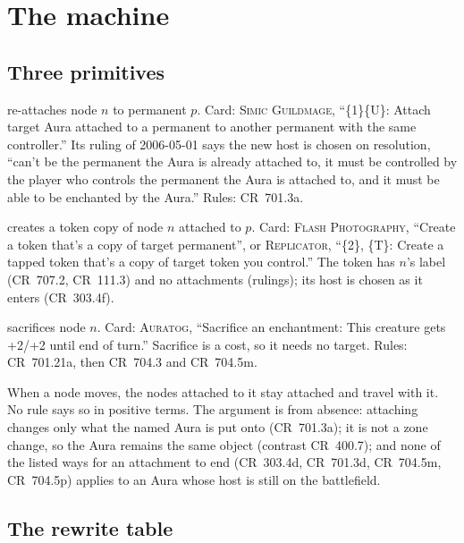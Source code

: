 \documentclass[11pt]{article}
\theoremstyle{definition}
\newcommand{\ms}[1]{\{#1\}}
\newcommand{\card}[1]{{\mdseries\scshape #1}}
\newcommand{\CR}[1]{CR~#1}
\newcommand{\mv}{\to}
\begin{document}
\section{The machine}\label{sec:machine}

\subsection{Three primitives}

\begin{description}[leftmargin=1em,nosep]
\item[MOVE$(n \mv p)$] re-attaches node $n$ to permanent $p$. Card: \card{Simic Guildmage},
  ``\ms{1}\ms{U}: Attach target Aura attached to a permanent to another permanent with the
  same controller.'' Its ruling of 2006-05-01 says the new host is chosen on resolution, ``can't be
  the permanent the Aura is already attached to, it must be controlled by the player who
  controls the permanent the Aura is attached to, and it must be able to be enchanted by
  the Aura.'' Rules: \CR{701.3a}.
\item[COPY$(n \mv p)$] creates a token copy of node $n$ attached to $p$. Card:
  \card{Flash Photography}, ``Create a token that's a copy of target permanent'', or
  \card{Replicator}, ``\ms{2}, \ms{T}: Create a tapped token that's a copy of target token you
  control.'' The token has $n$'s label (\CR{707.2}, \CR{111.3}) and no attachments (rulings);
  its host is chosen as it enters (\CR{303.4f}).
\item[SAC$(n)$] sacrifices node $n$. Card: \card{Auratog}, ``Sacrifice an enchantment: This
  creature gets +2/+2 until end of turn.'' Sacrifice is a cost, so it needs no target.
  Rules: \CR{701.21a}, then \CR{704.3} and \CR{704.5m}.
\end{description}

When a node moves, the nodes attached to it stay attached and travel with it. No rule says
so in positive terms. The argument is from absence: attaching changes only what the named
Aura is put onto (\CR{701.3a}); it is not a zone change, so the Aura remains the same object
(contrast \CR{400.7}); and none of the listed ways for an attachment to end
(\CR{303.4d}, \CR{701.3d}, \CR{704.5m}, \CR{704.5p}) applies to an Aura whose host is still on
the battlefield.

\subsection{The rewrite table}
\end{document}
